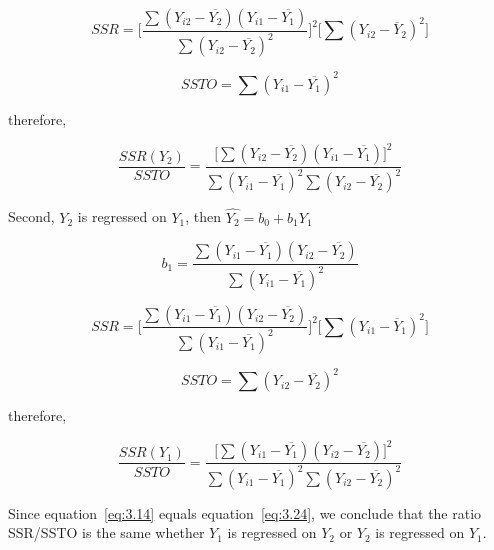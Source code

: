 \documentclass{article}
\begin{document}
\begin{equation} \tag{3.12}
SSR=\bigg[\frac{\sum (Y_{i2}-\overline{Y_{2}})(Y_{i1}-\overline{Y_{1}})}{\sum(Y_{i2}-\overline{Y_{2}})^2}\bigg]^2\big[\sum(Y_{i2}-\overline Y_{2})^2\big]
\end{equation}

\begin{equation} \tag{3.13}
SSTO=\sum(Y_{i1}-\overline{Y_{1}})^2
\end{equation}

therefore,

\begin{equation} \tag{3.14}
\frac{SSR(Y_{2})}{SSTO}=\frac{\big[\sum(Y_{i2}-\overline{Y_{2}})(Y_{i1}-\overline{Y_{1}})\big]^2}{\sum(Y_{i1}-\overline{Y_{1}})^2 \sum(Y_{i2}-\overline{Y_{2}})^2}
\label{eq:3.14}
\end{equation}

Second, $Y_{2}$ is regressed on $Y_{1}$, then $\widehat{Y_{2}}=b_{0}+b_{1}Y_{1}$

\begin{equation} \tag{3.21}
b_{1}=\frac{\sum (Y_{i1}-\overline{Y_{1}})(Y_{i2}-\overline{Y_{2}})}{\sum(Y_{i1}-\overline{Y_{1}})^2}
\end{equation}

\begin{equation} \tag{3.22}
SSR=\bigg[\frac{\sum (Y_{i1}-\overline{Y_{1}})(Y_{i2}-\overline{Y_{2}})}{\sum(Y_{i1}-\overline{Y_{1}})^2}\bigg]^2\big[\sum(Y_{i1}-\overline Y_{1})^2\big]
\end{equation}

\begin{equation} \tag{3.23}
SSTO=\sum(Y_{i2}-\overline{Y_{2}})^2
\end{equation}

therefore,

\begin{equation} \tag{3.24}
\frac{SSR(Y_{1})}{SSTO}=\frac{\big[\sum(Y_{i1}-\overline{Y_{1}})(Y_{i2}-\overline{Y_{2}})\big]^2}{\sum(Y_{i1}-\overline{Y_{1}})^2\sum(Y_{i2}-\overline{Y_{2}})^2}
\label{eq:3.24}
\end{equation}
\vspace{5mm}

Since equation~\ref{eq:3.14} equals equation~\ref{eq:3.24}, we conclude that the ratio SSR/SSTO is the same whether $Y_{1}$ is regressed on $Y_{2}$ or $Y_{2}$ is regressed on $Y_{1}$.
\end{document}
